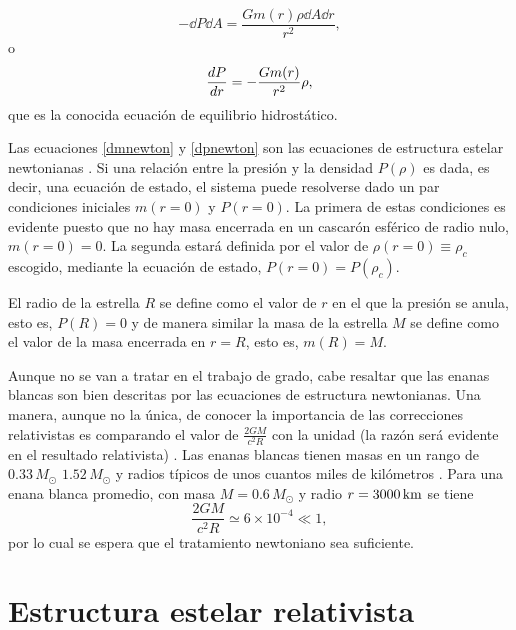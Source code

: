 \begin{equation}
    -\dd{P}\dd{A} =\frac{G m(r)\rho \dd{A} \dd{r}}{r^2},
\end{equation}
o
\begin{equation}
    \dv{P}{r} = - \frac { G m ( r ) } { r ^ { 2 } } \rho,
    \label{dpnewton}
\end{equation}
que es la conocida ecuación de equilibrio hidrostático. 

Las ecuaciones \eqref{dmnewton} y \eqref{dpnewton} son las ecuaciones de estructura estelar newtonianas \cite{Chandrasekhar1958}. Si una relación entre la presión y la densidad $P(\rho)$ es dada, es decir, una ecuación de estado, el sistema puede resolverse dado un par condiciones iniciales $m(r=0)$ y $P(r=0)$. La primera de estas condiciones es evidente puesto que no hay masa encerrada en un cascarón esférico de radio nulo, $m(r=0)=0$. La segunda estará definida por el valor de $\rho(r=0)\equiv\rho_c$ escogido, mediante la ecuación de estado, $P(r=0)=P(\rho_c)$.

El radio de la estrella $R$ se define como el valor de $r$ en el que la presión se anula, esto es, $P(R)=0$ y de manera similar la masa de la estrella $M$ se define como el valor de la masa encerrada en $r=R$, esto es, $m(R)=M$.

Aunque no se van a tratar en el trabajo de grado, cabe resaltar que las enanas blancas son bien descritas por las ecuaciones de estructura newtonianas. Una manera, aunque no la única, de conocer la importancia de las correcciones relativistas es comparando el valor de $\frac{2GM}{c^2R}$ con la unidad (la razón será evidente en el resultado relativista) \cite{Weinberg1972}. Las enanas blancas tienen masas en un rango de $0.33\,M_{\odot}$ $1.52\,M_{\odot}$ y radios típicos de unos cuantos miles de kilómetros \cite{Glendenning2000}. Para una enana blanca promedio, con masa $M=0.6\,M_{\odot}$ y radio $r=3000 \,\rm{km}$ se tiene
\begin{equation}
    \frac{2GM}{c^2R}\simeq 6\times 10^{-4}\ll 1,
\end{equation}
por lo cual se espera que el tratamiento newtoniano sea suficiente. 

\section{Estructura estelar relativista}

